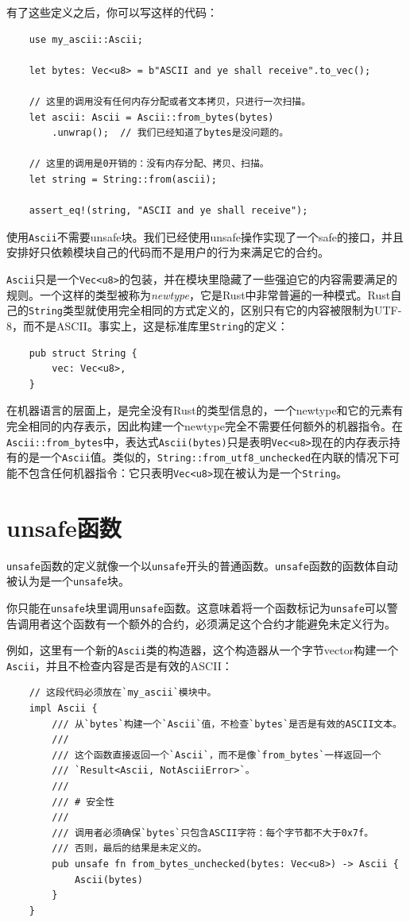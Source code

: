 有了这些定义之后，你可以写这样的代码：
\begin{verbatim}
    use my_ascii::Ascii;

    let bytes: Vec<u8> = b"ASCII and ye shall receive".to_vec();

    // 这里的调用没有任何内存分配或者文本拷贝，只进行一次扫描。
    let ascii: Ascii = Ascii::from_bytes(bytes)
        .unwrap();  // 我们已经知道了bytes是没问题的。

    // 这里的调用是0开销的：没有内存分配、拷贝、扫描。
    let string = String::from(ascii);

    assert_eq!(string, "ASCII and ye shall receive");
\end{verbatim}

使用\texttt{Ascii}不需要unsafe块。我们已经使用unsafe操作实现了一个safe的接口，并且安排好只依赖模块自己的代码而不是用户的行为来满足它的合约。

\texttt{Ascii}只是一个\texttt{Vec<u8>}的包装，并在模块里隐藏了一些强迫它的内容需要满足的规则。一个这样的类型被称为\emph{newtype}，它是Rust中非常普遍的一种模式。Rust自己的\texttt{String}类型就使用完全相同的方式定义的，区别只有它的内容被限制为UTF-8，而不是ASCII。事实上，这是标准库里\texttt{String}的定义：
\begin{verbatim}
    pub struct String {
        vec: Vec<u8>,
    }
\end{verbatim}

在机器语言的层面上，是完全没有Rust的类型信息的，一个newtype和它的元素有完全相同的内存表示，因此构建一个newtype完全不需要任何额外的机器指令。在\texttt{Ascii::from\_bytes}中，表达式\texttt{Ascii(bytes)}只是表明\texttt{Vec<u8>}现在的内存表示持有的是一个\texttt{Ascii}值。类似的，\texttt{String::from\_utf8\_unchecked}在内联的情况下可能不包含任何机器指令：它只表明\texttt{Vec<u8>}现在被认为是一个\texttt{String}。

\section{unsafe函数}
\texttt{unsafe}函数的定义就像一个以\texttt{unsafe}开头的普通函数。\texttt{unsafe}函数的函数体自动被认为是一个\texttt{unsafe}块。

你只能在\texttt{unsafe}块里调用\texttt{unsafe}函数。这意味着将一个函数标记为\texttt{unsafe}可以警告调用者这个函数有一个额外的合约，必须满足这个合约才能避免未定义行为。

例如，这里有一个新的\texttt{Ascii}类的构造器，这个构造器从一个字节vector构建一个\texttt{Ascii}，并且不检查内容是否是有效的ASCII：
\begin{verbatim}
    // 这段代码必须放在`my_ascii`模块中。
    impl Ascii {
        /// 从`bytes`构建一个`Ascii`值，不检查`bytes`是否是有效的ASCII文本。
        ///
        /// 这个函数直接返回一个`Ascii`，而不是像`from_bytes`一样返回一个
        /// `Result<Ascii, NotAsciiError>`。
        ///
        /// # 安全性
        ///
        /// 调用者必须确保`bytes`只包含ASCII字符：每个字节都不大于0x7f。
        /// 否则，最后的结果是未定义的。
        pub unsafe fn from_bytes_unchecked(bytes: Vec<u8>) -> Ascii {
            Ascii(bytes)
        }
    }
\end{verbatim}

